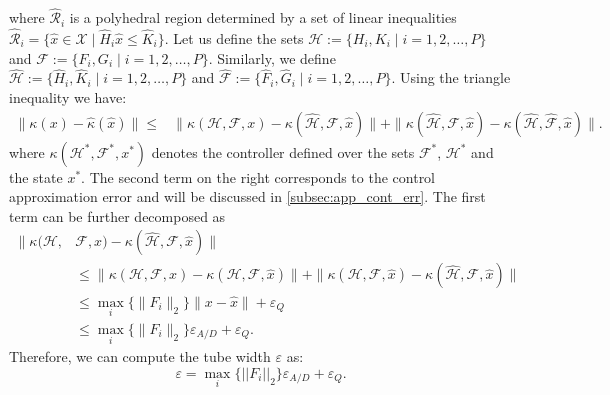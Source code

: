  	 	where $\mathcal{\hat R}_i$ is a polyhedral region determined by a set of linear inequalities 
$\mathcal{\hat R}_i= \{ \hat x\in\mathcal X\mid \hat H_i\hat x\leq \hat K_i\}$. 
Let us define the sets $\mathcal H := \{H_i,K_i\mid i=1,2,\ldots, P\}$ and $\mathcal F:=\{F_i,G_i \mid i=1,2,\ldots, P\}$. 
Similarly, we define $\hat{\mathcal H}:= \{\hat H_i,\hat K_i\mid i=1,2,\ldots, P\}$ and $\hat{\mathcal F}:=\{\hat F_i,\hat G_i\mid i=1,2,\ldots, P\}$. 
Using the triangle inequality we have:
 	 	\begin{align*}
 	 	\|\kappa(x)-\hat \kappa(\hat x)
 	 	\|\le&\|\kappa(\mathcal H,\mathcal F,x)-\kappa(\hat{\mathcal H},\mathcal F,\hat x)\| +\|\kappa(\hat{\mathcal H},\mathcal F,\hat x)-\kappa(\hat{\mathcal H},\hat{\mathcal F},\hat x)\|.
 	 	\end{align*}
 	 	where $\kappa(\mathcal H^*,\mathcal F^*,x^*)$ denotes the controller defined over the sets $\mathcal F^*$, $\mathcal H^*$ and the state $x^*$. 
	The second term on the right corresponds to the control approximation error and will be discussed in \autoref{subsec:app_cont_err}.
 	 	The first term can be further decomposed as
 	 	\begin{align*}
 	 	\|\kappa(\mathcal H,&\mathcal F,x)-\kappa(\hat{\mathcal H},\mathcal F,\hat x)\|\\
 	 	&\le \|\kappa(\mathcal H,\mathcal F,x)-\kappa(\mathcal H,\mathcal F,\hat x)\|+
 	 	\|\kappa(\mathcal H,\mathcal F,\hat x) - \kappa(\hat{\mathcal H},\mathcal F,\hat x)\|\\
 	 	&\le \max_i\{\|F_i\|_2\}\|x-\hat x\| + \varepsilon_Q\\
 	 	& \le \max_i\{\|F_i\|_2\}\varepsilon_{A/D}+ \varepsilon_Q.
 	 	\end{align*}
 	 	Therefore, we can compute the tube width $\varepsilon$ as:
 	 	\begin{equation}\label{eq:epsilontot}
 	 	\varepsilon=\max_i \{||F_i||_2\}\varepsilon_{A/D}+\varepsilon_{Q}.
 	 	\end{equation}
 	
